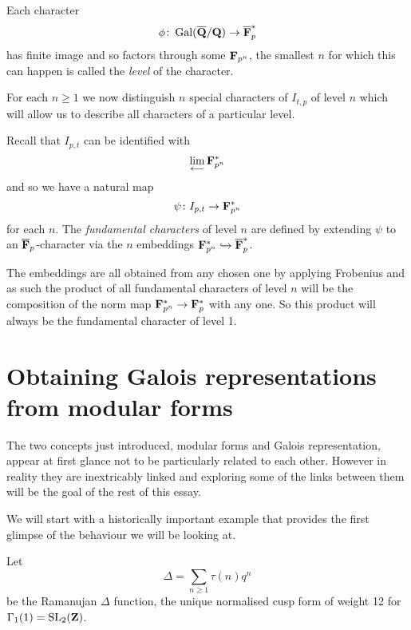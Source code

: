 \documentclass[a4paper,12pt]{article}
\begin{document}
\begin{defn}
Each character
\[
\phi \colon \operatorname{Gal}(\overline{\mathbf{Q}}/\mathbf{Q}) \to \overline{\mathbf{F}}_p^*
\]
has finite image and so factors through some $\mathbf{F}_{p^n}$, the smallest $n$ for which this can happen is called the \emph{level} of the character.
\end{defn}

For each $n \ge 1$ we now distinguish $n$ special characters of $I_{t,p}$ of level $n$ which will allow us to describe all characters of a particular level.

\begin{defn}\label{def-fund}
Recall that $I_{p,t}$ can be identified with
\[
\lim_{\longleftarrow} \mathbf{F}_{p^n}^*
\]
and so we have a natural map
\[
\psi\colon I_{p,t} \to \mathbf{F}_{p^n}^*
\]
for each $n$.
The \emph{fundamental characters} of level $n$ are defined by extending $\psi$ to an $\overline{\mathbf{F}}_p$-character via the $n$ embeddings $\mathbf{F}_{p^n}^* \hookrightarrow \overline{\mathbf{F}}_p^*$. %
\end{defn}

\begin{rmk}\label{rmk-prodchar}
The embeddings are all obtained from any chosen one by applying Frobenius and as such the product of all fundamental characters of level $n$ will be the composition of the norm map $\mathbf{F}_{p^n}^* \to \mathbf{F}_p^*$ with any one.
So this product will always be the fundamental character of level 1.
\end{rmk}



\section{Obtaining Galois representations from modular forms}
The two concepts just introduced, modular forms and Galois representation, appear at first glance not to be particularly related to each other.
However in reality they are inextricably linked and exploring some of the links between them will be the goal of the rest of this essay.

We will start with a historically important example that provides the first glimpse of the behaviour we will be looking at.

\begin{ex}\label{ex-delt}
Let
\[
\Delta = \sum_{n \ge 1} \tau(n) q^n
\]
be the Ramanujan $\Delta$ function, the unique normalised cusp form of weight 12 for $\Gamma_1(1) = \operatorname{SL}_2(\mathbf{Z})$.
\end{ex}
\end{document}
